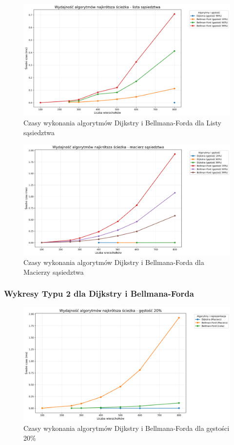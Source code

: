 \documentclass{article}
\begin{document}
\begin{figure}[H]
    \centering
    \includegraphics[scale=0.4]{../Python/charts_type1/Typ1_SHORTEST_PATH_AdjacencyList_wykres.png}
    \caption{Czasy wykonania algorytmów Dijkstry i Bellmana-Forda dla Listy sąsiedztwa}
\end{figure}
\begin{figure}[H]
    \centering
    \includegraphics[scale=0.4]{../Python/charts_type1/Typ1_SHORTEST_PATH_AdjacencyMatrix_wykres.png}
    \caption{Czasy wykonania algorytmów Dijkstry i Bellmana-Forda dla Macierzy sąsiedztwa}
\end{figure}

\subsubsection{Wykresy Typu 2 dla Dijkstry i Bellmana-Forda}

\begin{figure}[H]
    \centering
    \includegraphics[scale=0.4]{../Python/charts_type2/Typ2_SHORTEST_PATH_gestosc20_wykres.png}
    \caption{Czasy wykonania algorytmów Dijkstry i Bellmana-Forda dla gęstości 20\%}
\end{figure}
\end{document}
